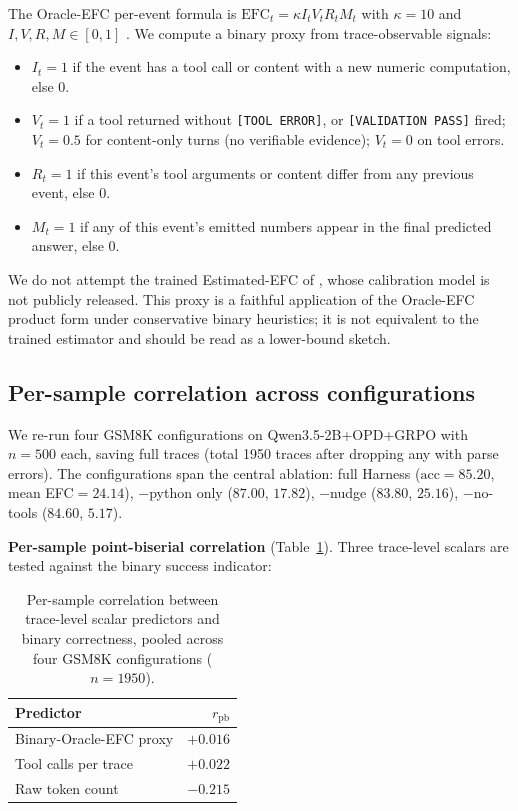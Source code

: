 \documentclass[10pt]{article}
\begin{document}
The Oracle-EFC per-event formula is $\text{EFC}_t = \kappa I_t V_t R_t M_t$ with $\kappa = 10$ and $I, V, R, M \in [0, 1]$ \citep{efc2026}. We compute a binary proxy from trace-observable signals:
\begin{itemize}
  \item $I_t = 1$ if the event has a tool call or content with a new numeric computation, else $0$.
  \item $V_t = 1$ if a tool returned without \texttt{[TOOL ERROR]}, or \texttt{[VALIDATION PASS]} fired; $V_t = 0.5$ for content-only turns (no verifiable evidence); $V_t = 0$ on tool errors.
  \item $R_t = 1$ if this event's tool arguments or content differ from any previous event, else $0$.
  \item $M_t = 1$ if any of this event's emitted numbers appear in the final predicted answer, else $0$.
\end{itemize}
We do not attempt the trained Estimated-EFC of \citet{efc2026}, whose calibration model is not publicly released. This proxy is a faithful application of the Oracle-EFC product form under conservative binary heuristics; it is not equivalent to the trained estimator and should be read as a lower-bound sketch.

\subsection{Per-sample correlation across configurations}

We re-run four GSM8K configurations on Qwen3.5-2B+OPD+GRPO with $n=500$ each, saving full traces (total 1950 traces after dropping any with parse errors). The configurations span the central ablation: full Harness ($\text{acc}{=}85.20$, mean EFC$=24.14$), $-$python only ($87.00$, $17.82$), $-$nudge ($83.80$, $25.16$), $-$no-tools ($84.60$, $5.17$).

\textbf{Per-sample point-biserial correlation} (Table~\ref{tab:efc-corr}). Three trace-level scalars are tested against the binary success indicator:

\begin{table}[h]
\centering
\caption{Per-sample correlation between trace-level scalar predictors and binary correctness, pooled across four GSM8K configurations ($n=1950$).}
\label{tab:efc-corr}
\begin{tabular}{lr}
\toprule
Predictor & $r_\text{pb}$ \\
\midrule
Binary-Oracle-EFC proxy & $+0.016$ \\
Tool calls per trace & $+0.022$ \\
Raw token count & $-0.215$ \\
\bottomrule
\end{tabular}
\end{table}
\end{document}
